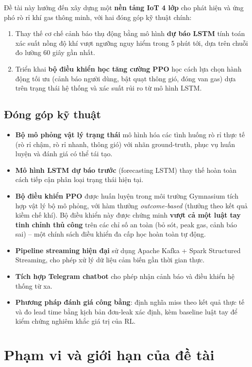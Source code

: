 Đề tài này hướng đến xây dựng một \textbf{nền tảng IoT 4 lớp} cho phát hiện và ứng phó rò rỉ khí gas thông minh, với hai đóng góp kỹ thuật chính:

\begin{enumerate}
  \item Thay thế cơ chế cảnh báo thụ động bằng mô hình \textbf{dự báo LSTM} tính toán xác suất nồng độ khí vượt ngưỡng nguy hiểm trong 5 phút tới, dựa trên chuỗi đo lường 60 giây gần nhất.
  \item Triển khai \textbf{bộ điều khiển học tăng cường PPO} học cách lựa chọn hành động tối ưu (cảnh báo người dùng, bật quạt thông gió, đóng van gas) dựa trên trạng thái hệ thống và xác suất rủi ro từ mô hình LSTM.
\end{enumerate}

\subsection{Đóng góp kỹ thuật}

\begin{itemize}
  \item \textbf{Bộ mô phỏng vật lý trạng thái} mô hình hóa các tình huống rò rỉ thực tế (rò rỉ chậm, rò rỉ nhanh, thông gió) với nhãn ground-truth, phục vụ huấn luyện và đánh giá có thể tái tạo.
  \item \textbf{Mô hình LSTM dự báo trước} (forecasting LSTM) thay thế hoàn toàn cách tiếp cận phân loại trạng thái hiện tại.
  \item \textbf{Bộ điều khiển PPO} được huấn luyện trong môi trường Gymnasium tích hợp vật lý bộ mô phỏng, với hàm thưởng \textit{outcome-based} (thưởng theo kết quả kiềm chế khí). Bộ điều khiển này được chứng minh \textbf{vượt cả một luật tay tinh chỉnh thủ công} trên các chỉ số an toàn (bỏ sót, peak gas, cảnh báo sai) -- một chính sách điều khiển đa cấp học hoàn toàn tự động.
  \item \textbf{Pipeline streaming hiện đại} sử dụng Apache Kafka + Spark Structured Streaming, cho phép xử lý dữ liệu cảm biến gần thời gian thực.
  \item \textbf{Tích hợp Telegram chatbot} cho phép nhận cảnh báo và điều khiển hệ thống từ xa.
  \item \textbf{Phương pháp đánh giá công bằng}: định nghĩa miss theo kết quả thực tế và đo lead time bằng kịch bản đơn-leak xác định, kèm baseline luật tay để kiểm chứng nghiêm khắc giá trị của RL.
\end{itemize}

\section{Phạm vi và giới hạn của đề tài}

